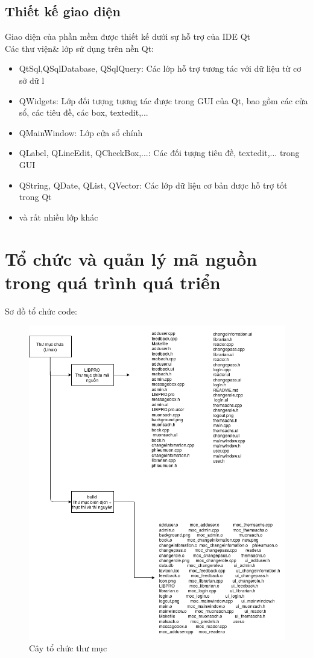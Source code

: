 \documentclass[a4paper]{article}
\begin{document}
\subsection{Thiết kế giao diện}
Giao diện của phần mềm được thiết kế dưới sự hỗ trợ của IDE Qt\\
Các thư viện\& lớp sử dụng trên nền Qt:\\
\begin{itemize}
\item QtSql,QSqlDatabase, QSqlQuery: Các lớp hỗ trợ tương tác với dữ liệu từ cơ sở dữ l
\item QWidgets: Lớp đối tượng tương tác được trong GUI của Qt, bao gồm các cửa sổ, các tiêu đề, các box, textedit,...
\item QMainWindow: Lớp cửa sổ chính
\item QLabel, QLineEdit, QCheckBox,...: Các đối tượng tiêu đề, textedit,... trong GUI
\item QString, QDate, QList, QVector: Các lớp dữ liệu cơ bản được hỗ trợ tốt trong Qt
\item và rất nhiều lớp khác
\end{itemize}

\section{Tổ chức và quản lý mã nguồn trong quá trình quá triển}
Sơ đồ tổ chức code:\\
\begin{figure}[h!]
	\begin{center}
		\includegraphics[scale=.5]{folderStructure.png}
		\caption{Cây tổ chức thư mục}
	\end{center}
\end{figure}
	\newpage \newpage 
\end{document}
